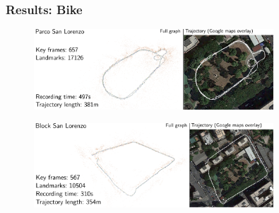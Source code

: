\documentclass[11pt]{beamer}
\begin{document}
\begin{frame}
\frametitle{Results: Bike}
\begin{figure}[!htb]
\centering
\includegraphics[width=0.8\textwidth]{figures/results/san_lorenzo_parco.pdf}
\end{figure}
\begin{figure}[!htb]
\centering
\includegraphics[width=0.8\textwidth]{figures/results/san_lorenzo_street.pdf}
\end{figure}
\end{frame}
\end{document}
